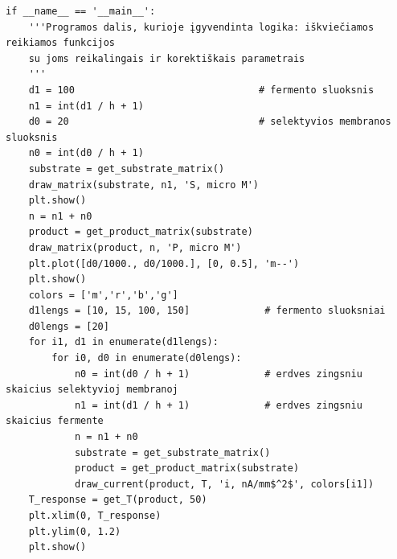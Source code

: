 \documentclass[12pt, a4paper, lithuanian]{article}
\begin{document}
\begin{verbatim}
if __name__ == '__main__':
    '''Programos dalis, kurioje įgyvendinta logika: iškviečiamos reikiamos funkcijos
    su joms reikalingais ir korektiškais parametrais
    '''
    d1 = 100                                # fermento sluoksnis
    n1 = int(d1 / h + 1)
    d0 = 20                                 # selektyvios membranos sluoksnis
    n0 = int(d0 / h + 1)
    substrate = get_substrate_matrix()
    draw_matrix(substrate, n1, 'S, micro M')
    plt.show()
    n = n1 + n0
    product = get_product_matrix(substrate)
    draw_matrix(product, n, 'P, micro M')
    plt.plot([d0/1000., d0/1000.], [0, 0.5], 'm--')
    plt.show()
    colors = ['m','r','b','g']
    d1lengs = [10, 15, 100, 150]             # fermento sluoksniai
    d0lengs = [20]
    for i1, d1 in enumerate(d1lengs):
        for i0, d0 in enumerate(d0lengs):
            n0 = int(d0 / h + 1)             # erdves zingsniu skaicius selektyvioj membranoj
            n1 = int(d1 / h + 1)             # erdves zingsniu skaicius fermente
            n = n1 + n0
            substrate = get_substrate_matrix()
            product = get_product_matrix(substrate)
            draw_current(product, T, 'i, nA/mm$^2$', colors[i1])
    T_response = get_T(product, 50)
    plt.xlim(0, T_response)
    plt.ylim(0, 1.2)
    plt.show()
\end{verbatim}

%
\end{document}
